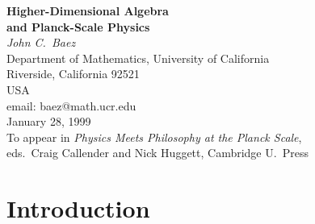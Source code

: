 \documentclass[12pt,amsfonts]{article}
\begin{document}
      \begin{center}
      {\bf Higher-Dimensional Algebra \\
      and Planck-Scale Physics  \\}
      \vspace{0.5cm}
      {\em John C.\ Baez\\}
      \vspace{0.3cm}
      {\small Department of Mathematics, University of California\\ 
      Riverside, California 92521 \\
      USA\\ }
      \vspace{0.3cm}
      {\small email: baez@math.ucr.edu\\}
      \vspace{0.3cm}
      {\small January 28, 1999 \\ }
      \vspace{0.3cm}
{\small To appear in {\sl Physics Meets Philosophy at the Planck Scale}, \\
eds.\ Craig Callender and Nick Huggett, Cambridge U.\ Press}
      \end{center}

\begin{abstract}

This is a nontechnical introduction to recent work on 
quantum gravity using ideas from higher-dimensional algebra.  
We argue that reconciling general relativity with the 
Standard Model requires a `background-free quantum theory with 
local degrees of freedom propagating causally'.  We describe
the insights provided by work on topological quantum field theories
such as quantum gravity in 3-dimensional spacetime.  These are
background-free quantum theories lacking local degrees of freedom,
so they only display some of the features we seek.  However, they
suggest a deep link between the concepts of `space' and `state',
and similarly those of `spacetime' and `process', which we argue 
is to be expected in any background-free quantum theory.  We sketch 
how higher-dimensional algebra provides the mathematical tools to
make this link precise.  Finally, we comment on attempts to formulate
a theory of quantum gravity in 4-dimensional spacetime using
`spin networks' and `spin foams'.   

\end{abstract}

\section{Introduction}
\end{document}
